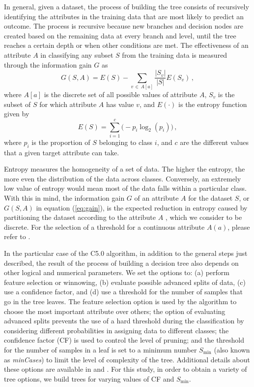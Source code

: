 In general, given a dataset, the process of building the tree consists of recursively identifying the attributes in the training data that are most likely to predict an outcome. The process is recursive because new branches and decision nodes are created based on the remaining data at every branch and level, until the tree reaches a certain depth or when other conditions are met. The effectiveness of an attribute $A$ in classifying any subset $S$ from the training data is measured through the information gain $G$ as
%
\begin{equation}
	\label{eq:gain}
	G(S,A) = E(S) - \sum_{v \, \in \, A[a]} \frac{ \left| S_v \right| }{ \left| S \right| } E \left( S_v \right)
	\, ,
\end{equation}
%
where $A[a]$ is the discrete set of all possible values of attribute $A$, $S_v$ is the subset of $S$ for which attribute $A$ has value $v$, and $E(\cdot)$ is the entropy function given by
%
\begin{equation}
	E(S) = \sum_{i=1}^{c} \Big( -p_i \log_2 \left(p_i\right) \Big)
	\, ,
\end{equation}
%
where $p_i$ is the proportion of $S$ belonging to class $i$, and $c$ are the different values that a given target attribute can take.

Entropy measures the homogeneity of a set of data. The higher the entropy, the more even the distribution of the data across classes. Conversely, an extremely low value of entropy would mean most of the data falls within a particular class. With this in mind, the information gain $G$ of an attribute $A$ for the dataset $S$, or $G(S,A)$ in equation (\ref{eq:gain}), is the expected reduction in entropy caused by partitioning the dataset according to the attribute $A$ \citep{Mitchell_1997_Book}, which we consider to be discrete. For the selection of a threshold for a continuous attribute $A(a)$, please refer to \citet{Quinlan_1996_JAIR}.

In the particular case of the C5.0 algorithm, in addition to the general steps just described, the result of the process of building a decision tree also depends on other logical and numerical parameters. We set the options to: (a) perform feature selection or winnowing, (b) evaluate possible advanced splits of data, (c) use a confidence factor, and (d) use a threshold for the number of samples that go in the tree leaves. The feature selection option is used by the algorithm to choose the most important attribute over others; the option of evaluating advanced splits prevents the use of a hard threshold during the classification by considering different probabilities in assigning data to different classes; the confidence factor (CF) is used to control the level of pruning; and the threshold for the number of samples in a leaf is set to a minimum number $S_{\min}$ (also known as \textit{minCases}) to limit the level of complexity of the tree. Additional details about these options are available in \citet{Quinlan_1993_Book} and \citet{Kuhn_2017_Manual}. For this study, in order to obtain a variety of tree options, we build trees for varying values of CF and $S_{\min}$.

